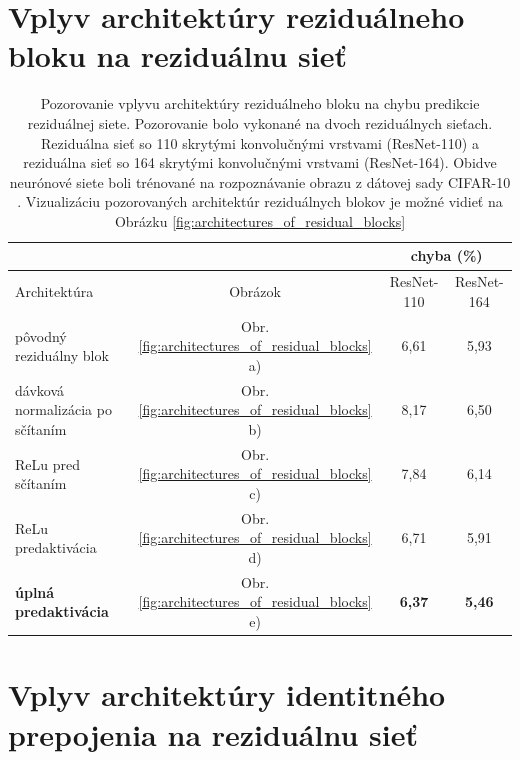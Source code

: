\section{Vplyv architektúry reziduálneho bloku na reziduálnu sieť}

\begin{table}[h]
\caption[Porovnanie architektúr reziduálneho bloku]{Pozorovanie vplyvu architektúry reziduálneho bloku na chybu predikcie reziduálnej siete. Pozorovanie bolo vykonané na dvoch reziduálnych sieťach. Reziduálna sieť so 110 skrytými konvolučnými vrstvami (ResNet-110) a reziduálna sieť so 164 skrytými konvolučnými vrstvami (ResNet-164). Obidve neurónové siete boli trénované na rozpoznávanie obrazu z dátovej sady CIFAR-10 \cite{He2016}. Vizualizáciu pozorovaných architektúr reziduálnych blokov je možné vidieť na Obrázku \ref{fig:architectures_of_residual_blocks}}
\label{compareArchitectures}
\begin{center}
\begin{tabular}{l|c|c|c}
\toprule
\multicolumn{2}{c}{} & \multicolumn{2}{c}{chyba (\%)} \\
\midrule
Architektúra & Obrázok & ResNet-110  & ResNet-164\\ \hline
\hline
pôvodný reziduálny blok          & Obr. \ref{fig:architectures_of_residual_blocks} a) & 6,61 & 5,93 \\
dávková normalizácia po sčítaním & Obr. \ref{fig:architectures_of_residual_blocks} b) & 8,17 & 6,50 \\
ReLu pred sčítaním               & Obr. \ref{fig:architectures_of_residual_blocks} c) & 7,84 & 6,14 \\
ReLu predaktivácia               & Obr. \ref{fig:architectures_of_residual_blocks} d) & 6,71 & 5,91 \\
\textbf{úplná predaktivácia}     & Obr. \ref{fig:architectures_of_residual_blocks} e) & \textbf{6,37} & \textbf{5,46} \\
\hline
\bottomrule
\end{tabular}%
\end{center}
\end{table}
\newpage

\section{Vplyv architektúry identitného prepojenia na reziduálnu sieť}


